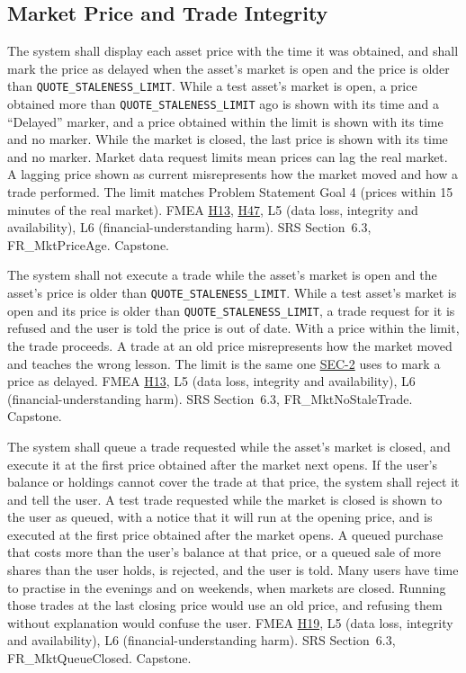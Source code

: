 \documentclass{article}
\newcommand{\reqref}[1]{\hyperref[req:#1]{#1}}
\newcommand{\hazref}[1]{\hyperref[#1]{#1}}
\begin{document}
\subsection{Market Price and Trade Integrity}

\begin{description}

{The system shall display each asset price with the time it was obtained, and
shall mark the price as delayed when the asset's market is open and the price
is older than \texttt{QUOTE\_STALENESS\_LIMIT}.}
{While a test asset's market is open, a price obtained more than
\texttt{QUOTE\_STALENESS\_LIMIT} ago is shown with its time and a ``Delayed''
marker, and a price obtained within the limit is shown with its time and no
marker. While the market is closed, the last price is shown with its time and
no marker.}
{Market data request limits mean prices can lag the real market. A lagging
price shown as current misrepresents how the market moved and how a trade
performed. The limit matches Problem Statement Goal 4 (prices within 15 minutes
of the real market).}
{FMEA \hazref{H13}, \hazref{H47}, L5 (data loss, integrity and availability), L6 (financial-understanding
harm).}
{SRS Section~6.3, FR\_MktPriceAge.}
{Capstone.}

{The system shall not execute a trade while the asset's market is open and the
asset's price is older than \texttt{QUOTE\_STALENESS\_LIMIT}.}
{While a test asset's market is open and its price is older than
\texttt{QUOTE\_STALENESS\_LIMIT}, a trade request for it is refused and the
user is told the price is out of date. With a price within the limit, the trade
proceeds.}
{A trade at an old price misrepresents how the market moved and teaches the
wrong lesson. The limit is the same one \reqref{SEC-2} uses to mark a price as
delayed.}
{FMEA \hazref{H13}, L5 (data loss, integrity and availability), L6 (financial-understanding harm).}
{SRS Section~6.3, FR\_MktNoStaleTrade.}
{Capstone.}

{The system shall queue a trade requested while the asset's market is closed,
and execute it at the first price obtained after the market next opens. If the
user's balance or holdings cannot cover the trade at that price, the system
shall reject it and tell the user.}
{A test trade requested while the market is closed is shown to the user as
queued, with a notice that it will run at the opening price, and is executed
at the first price obtained after the market opens. A queued purchase that
costs more than the user's balance at that price, or a queued sale of more
shares than the user holds, is rejected, and the user is told.}
{Many users have time to practise in the evenings and on weekends, when markets
are closed. Running those trades at the last closing price would use an old
price, and refusing them without explanation would confuse the user.}
{FMEA \hazref{H19}, L5 (data loss, integrity and availability), L6 (financial-understanding harm).}
{SRS Section~6.3, FR\_MktQueueClosed.}
{Capstone.}


\end{description}
\end{document}
